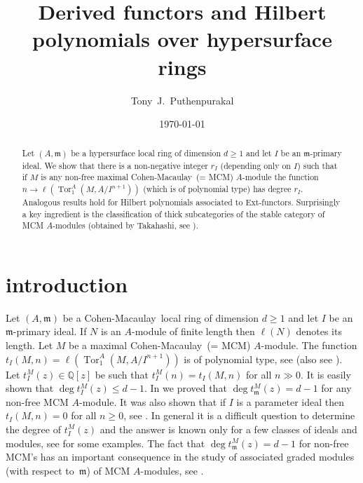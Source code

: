 \documentclass{amsart}
\newcommand{\CM}{Cohen-Macaulay}
\newcommand{\wrt}{with respect to}
\newcommand{\m}{\mathfrak{m} }
\newcommand{\rt}{\rightarrow}
\newcommand{\Tor}{\operatorname{Tor}}
\theoremstyle{plain}
\theoremstyle{definition}
\theoremstyle{remark}
\begin{document}
\title[Hilbert polynomials]{Derived functors and Hilbert polynomials over hypersurface rings }
\author{Tony~J.~Puthenpurakal}
\date{\today}
\address{Department of Mathematics, IIT Bombay, Powai, Mumbai 400 076}


 \begin{abstract}
Let $(A,\m)$ be a hypersurface local ring of dimension $d \geq 1$ and let $I$ be an $\m$-primary ideal. We show that there is a non-negative integer $r_I$ (depending only on $I$) such that if $M$ is any non-free maximal \CM \ (=  MCM)
$A$-module the  function $n \rt \ell(\Tor^A_1(M, A/I^{n+1}))$ (which is of polynomial type) has degree $r_I$. Analogous results hold for Hilbert polynomials associated to Ext-functors.
Surprisingly a  key ingredient is the classification of thick subcategories of the  stable category of MCM $A$-modules (obtained by Takahashi, see \cite[6.6]{T}).
\end{abstract}
 \maketitle
\section{introduction}
Let $(A,\m)$ be a \CM \ local ring  of dimension $d \geq 1$ and let $I$ be an $\m$-primary ideal. If $N$ is an $A$-module of finite length then $\ell(N)$ denotes its length. Let $M$ be a maximal \CM \ (= MCM) $A$-module. The function $t_I(M, n) = \ell(\Tor^A_1(M, A/I^{n+1}))$ is of polynomial type, see \cite[Corollary 4]{Theo} (also see \cite[Proposition 17]{P1}). Let $t_I^M(z) \in  \mathbb{Q}[z]$ be such that $t_I^M(n) = t_I(M, n)$ for all $n \gg 0$. It is easily shown that $\deg t_I^M(z) \leq d - 1$. In \cite[Theorem 18]{P1} we proved that
$\deg t_\m^M(z)  = d-1$ for any non-free MCM $A$-module. It was also shown that if $I$ is a parameter ideal then $t_I(M, n) = 0$ for all $n \geq 0$, see \cite[Remark 20]{P1}.
In general it is a difficult question to determine the degree of $t_I^M(z)$ and the answer is known only for a few classes of ideals and modules, see \cite[3.5]{KT} for  some examples.
The fact that $\deg t_\m^M(z)  = d-1$  for non-free MCM's has an important consequence in the study of associated graded modules (\wrt \ $\m$) of MCM $A$-modules, see \cite{P3}.
\end{document}
